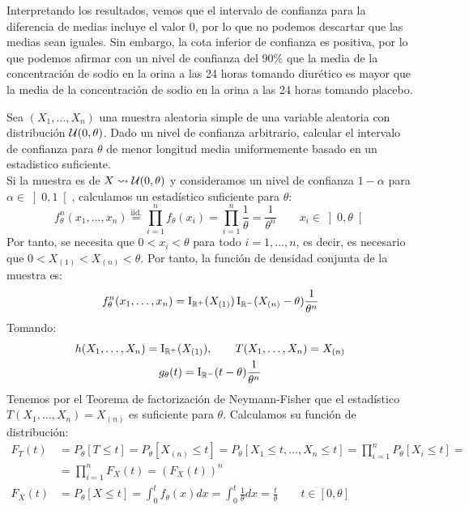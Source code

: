 \begin{ejercicio}
\begin{enumerate}[label=\alph*)]
            Interpretando los resultados, vemos que el intervalo de confianza para la diferencia de medias incluye el valor $0$, por lo que no podemos descartar que las medias sean iguales. Sin embargo, la cota inferior de confianza es positiva, por lo que podemos afirmar con un nivel de confianza del $90\%$ que la media de la concentración de sodio en la orina a las 24 horas tomando diurético es mayor que la media de la concentración de sodio en la orina a las 24 horas tomando placebo.
    \end{enumerate}
\end{ejercicio}

\begin{ejercicio}
    Sea $(X_1, \ldots, X_n)$ una muestra aleatoria simple de una variable aleatoria con distribución $\mathcal{U}(0,\theta)$. Dado un nivel de confianza arbitrario, calcular el intervalo de confianza para $\theta$ de menor longitud media uniformemente basado en un estadistico suficiente.\\

    \noindent
    Si la muestra es de $X\rightsquigarrow \mathcal{U}(0,\theta)$ y consideramos un nivel de confianza $1-\alpha$ para $\alpha \in \left]0,1\right[$, calculamos un estadístico suficiente para $\theta$:
    \begin{equation*}
        f_\theta^n(x_1, \ldots, x_n) \stackrel{\text{iid.}}{=} \prod_{i=1}^{n}f_\theta(x_i) = \prod_{i=1}^{n}\frac{1}{\theta} = \frac{1}{\theta^n} \qquad x_i \in \left]0,\theta\right[
    \end{equation*}
    Por tanto, se necesita que $0<x_i<\theta$ para todo $i=1,\ldots,n$, es decir, es necesario que $0<X_{(1)}<X_{(n)}<\theta$. Por tanto, la función de densidad conjunta de la muestra es:
    \begin{equation*}
        f_\theta^n(x_1, \ldots, x_n) = \operatorname{I}_{\mathbb{R}^+}(X_{(1)}) \operatorname{I}_{\mathbb{R}^-}(X_{(n)}-\theta)\frac{1}{\theta^n}
    \end{equation*}
    Tomando:
    \begin{gather*}
        h(X_1, \ldots, X_n) = \operatorname{I}_{\mathbb{R}^+}(X_{(1)}), \qquad T(X_1, \ldots, X_n) = X_{(n)} \\
        g_\theta(t) = \operatorname{I}_{\mathbb{R}^-}(t-\theta)\frac{1}{\theta^n}
    \end{gather*}
    Tenemos por el Teorema de factorización de Neymann-Fisher que el estadístico $T(X_1, \ldots, X_n) = X_{(n)}$ es suficiente para $\theta$. Calculamos su función de distribución:
    \begin{align*}
        F_T(t) &= P_\theta[T\leq t] = P_\theta[X_{(n)}\leq t] = P_\theta[X_1\leq t, \ldots, X_n\leq t] = \prod_{i=1}^{n}P_\theta[X_i\leq t] =\\&= \prod_{i=1}^{n}F_X(t) = {(F_X(t))}^{n} \\
        F_X(t) &= P_\theta[X\leq t] = \int_{0}^{t}f_\theta(x)dx = \int_{0}^{t}\frac{1}{\theta}dx = \frac{t}{\theta} \qquad t\in [0,\theta]
    \end{align*}


\end{ejercicio}

